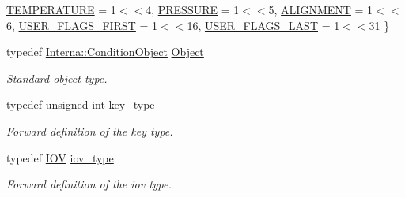\begin{DoxyCompactItemize}
\newline
\hyperlink{class_d_d4hep_1_1_conditions_1_1_condition_a22825c02029e39fd0aa95c08c9be56d9a2473120270dacdf59c4d2ad3e2448b5e}{T\+E\+M\+P\+E\+R\+A\+T\+U\+RE} = 1$<$$<$4, 
\hyperlink{class_d_d4hep_1_1_conditions_1_1_condition_a22825c02029e39fd0aa95c08c9be56d9acc3efde567a81db8bb17e82694367ed8}{P\+R\+E\+S\+S\+U\+RE} = 1$<$$<$5, 
\hyperlink{class_d_d4hep_1_1_conditions_1_1_condition_a22825c02029e39fd0aa95c08c9be56d9a6b6a69db6a46a34008646da2d4e24c8f}{A\+L\+I\+G\+N\+M\+E\+NT} = 1$<$$<$6, 
\hyperlink{class_d_d4hep_1_1_conditions_1_1_condition_a22825c02029e39fd0aa95c08c9be56d9a1a23fffc99552355e8f769351699b9a7}{U\+S\+E\+R\+\_\+\+F\+L\+A\+G\+S\+\_\+\+F\+I\+R\+ST} = 1$<$$<$16, 
\newline
\hyperlink{class_d_d4hep_1_1_conditions_1_1_condition_a22825c02029e39fd0aa95c08c9be56d9afb991714d979422b523fd4c3259bedbf}{U\+S\+E\+R\+\_\+\+F\+L\+A\+G\+S\+\_\+\+L\+A\+ST} = 1$<$$<$31
 \}
\item 
typedef \hyperlink{class_d_d4hep_1_1_conditions_1_1_interna_1_1_condition_object}{Interna\+::\+Condition\+Object} \hyperlink{class_d_d4hep_1_1_conditions_1_1_condition_a6fc8dae0dad41db6a237920c85f8a55d}{Object}
\begin{DoxyCompactList}\small\item\em Standard object type. \end{DoxyCompactList}\item 
typedef unsigned int \hyperlink{class_d_d4hep_1_1_conditions_1_1_condition_a7528efa762e8cc072ef80ea67c3531f9}{key\+\_\+type}
\begin{DoxyCompactList}\small\item\em Forward definition of the key type. \end{DoxyCompactList}\item 
typedef \hyperlink{class_d_d4hep_1_1_i_o_v}{I\+OV} \hyperlink{class_d_d4hep_1_1_conditions_1_1_condition_ad84300e226b2085ec5e9db7f47be5539}{iov\+\_\+type}
\begin{DoxyCompactList}\small\item\em Forward definition of the iov type. \end{DoxyCompactList}\end{DoxyCompactItemize}
